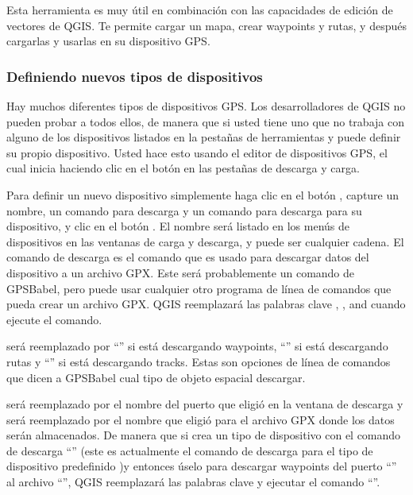 Esta herramienta es muy útil en combinación con las capacidades de edición de vectores de QGIS. Te permite cargar un mapa, crear waypoints y rutas, y después cargarlas y usarlas en su dispositivo GPS.

\subsubsection{\label{sec:Defining-new-device}Definiendo nuevos tipos de dispositivos}

Hay muchos diferentes tipos de dispositivos GPS.
Los desarrolladores de QGIS no pueden probar a todos ellos, de manera que si usted tiene uno que no trabaja con alguno de los dispositivos listados en la pestañas de herramientas  y  puede definir su propio dispositivo.
Usted hace esto usando el editor de dispositivos GPS, el cual inicia haciendo clic en el botón  en las pestañas de descarga y carga.

Para definir un nuevo dispositivo simplemente haga clic en el botón , capture un nombre, un comando para descarga y un comando para descarga para su dispositivo, y clic en el botón .
El nombre será listado en los menús de dispositivos en las ventanas de carga y descarga, y puede ser cualquier cadena.
El comando de descarga es el comando que es usado para descargar datos del dispositivo a un archivo GPX.
Este será probablemente un comando de GPSBabel, pero puede usar cualquier otro programa de línea de comandos que pueda crear un archivo GPX.
QGIS reemplazará las palabras clave , , and  cuando ejecute el comando.

 será reemplazado por {}``'' si está descargando waypoints, {}``'' si está descargando rutas y {}``'' si está descargando tracks.
Estas son opciones de línea de comandos que dicen a GPSBabel cual tipo de objeto espacial descargar.

 será reemplazado por el nombre del puerto que eligió en la ventana de descarga y  será reemplazado por el nombre que eligió para el archivo GPX donde los datos serán almacenados.
De manera que si crea un tipo de dispositivo con el comando de descarga {}``'' (este es actualmente el comando de descarga para el tipo de dispositivo predefinido )y entonces úselo para descargar waypoints del puerto {}``'' al archivo {}``'', QGIS reemplazará las palabras clave y ejecutar el comando {}``''.

